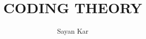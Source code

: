 \documentclass{book}
\begin{document}
	\title{CODING THEORY}
	\author{Sayan Kar}
	\maketitle
	 \tableofcontents



\appendix

\end{document}
